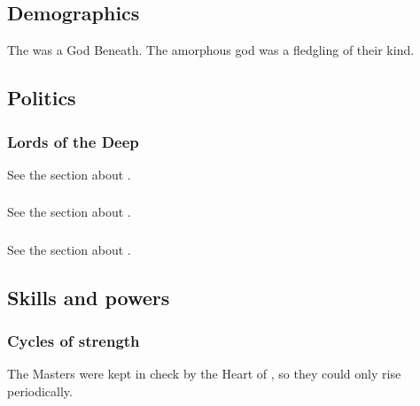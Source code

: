 \subsection{Demographics}
The \noggyal {} was a God Beneath. 
The amorphous god  was a fledgling of their kind. 








\subsection{Politics}





\subsubsection{Lords of the Deep}
See the section about . 





\subsubsection{\Noggyaleth}
See the section about . 





\subsubsection{\Shugul}
See the section about . 










\subsection{Skills and powers}





\subsubsection{Cycles of strength}
The Masters were kept in check by the Heart of \Miith, so they could only rise periodically.

